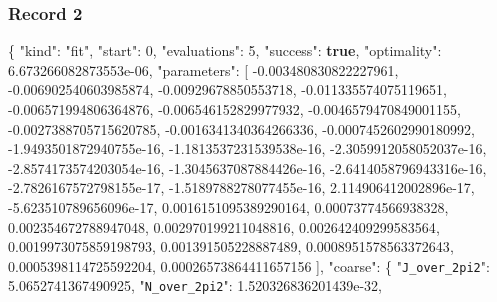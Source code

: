 \documentclass[
  10pt,
]{article}
\newenvironment{Shaded}{}{}
\newcommand{\DataTypeTok}[1]{\textcolor[rgb]{0.56,0.13,0.00}{#1}}
\newcommand{\DecValTok}[1]{\textcolor[rgb]{0.25,0.63,0.44}{#1}}
\newcommand{\FloatTok}[1]{\textcolor[rgb]{0.25,0.63,0.44}{#1}}
\newcommand{\FunctionTok}[1]{\textcolor[rgb]{0.02,0.16,0.49}{#1}}
\newcommand{\KeywordTok}[1]{\textcolor[rgb]{0.00,0.44,0.13}{\textbf{#1}}}
\newcommand{\OtherTok}[1]{\textcolor[rgb]{0.00,0.44,0.13}{#1}}
\newcommand{\StringTok}[1]{\textcolor[rgb]{0.25,0.44,0.63}{#1}}
\begin{document}
\hypertarget{record-2-3}{%
\subsubsection{Record 2}\label{record-2-3}}

\begin{Shaded}
\begin{Highlighting}[]
\FunctionTok{\{}
  \DataTypeTok{"kind"}\FunctionTok{:} \StringTok{"fit"}\FunctionTok{,}
  \DataTypeTok{"start"}\FunctionTok{:} \DecValTok{0}\FunctionTok{,}
  \DataTypeTok{"evaluations"}\FunctionTok{:} \DecValTok{5}\FunctionTok{,}
  \DataTypeTok{"success"}\FunctionTok{:} \KeywordTok{true}\FunctionTok{,}
  \DataTypeTok{"optimality"}\FunctionTok{:} \FloatTok{6.673266082873553e{-}06}\FunctionTok{,}
  \DataTypeTok{"parameters"}\FunctionTok{:} \OtherTok{[}
    \FloatTok{{-}0.003480830822227961}\OtherTok{,}
    \FloatTok{{-}0.006902540603985874}\OtherTok{,}
    \FloatTok{{-}0.00929678850553718}\OtherTok{,}
    \FloatTok{{-}0.011335574075119651}\OtherTok{,}
    \FloatTok{{-}0.006571994806364876}\OtherTok{,}
    \FloatTok{{-}0.006546152829977932}\OtherTok{,}
    \FloatTok{{-}0.0046579470849001155}\OtherTok{,}
    \FloatTok{{-}0.0027388705715620785}\OtherTok{,}
    \FloatTok{{-}0.0016341340364266336}\OtherTok{,}
    \FloatTok{{-}0.0007452602990180992}\OtherTok{,}
    \FloatTok{{-}1.9493501872940755e{-}16}\OtherTok{,}
    \FloatTok{{-}1.1813537231539538e{-}16}\OtherTok{,}
    \FloatTok{{-}2.3059912058052037e{-}16}\OtherTok{,}
    \FloatTok{{-}2.8574173574203054e{-}16}\OtherTok{,}
    \FloatTok{{-}1.3045637087884426e{-}16}\OtherTok{,}
    \FloatTok{{-}2.6414058796943316e{-}16}\OtherTok{,}
    \FloatTok{{-}2.7826167572798155e{-}17}\OtherTok{,}
    \FloatTok{{-}1.5189788278077455e{-}16}\OtherTok{,}
    \FloatTok{2.114906412002896e{-}17}\OtherTok{,}
    \FloatTok{{-}5.623510789656096e{-}17}\OtherTok{,}
    \FloatTok{0.0016151095389290164}\OtherTok{,}
    \FloatTok{0.00073774566938328}\OtherTok{,}
    \FloatTok{0.002354672788947048}\OtherTok{,}
    \FloatTok{0.002970199211048816}\OtherTok{,}
    \FloatTok{0.002642409299583564}\OtherTok{,}
    \FloatTok{0.0019973075859198793}\OtherTok{,}
    \FloatTok{0.001391505228887489}\OtherTok{,}
    \FloatTok{0.0008951578563372643}\OtherTok{,}
    \FloatTok{0.0005398114725592204}\OtherTok{,}
    \FloatTok{0.00026573864411657156}
  \OtherTok{]}\FunctionTok{,}
  \DataTypeTok{"coarse"}\FunctionTok{:} \FunctionTok{\{}
    \DataTypeTok{"\nolinkurl{J_over_2pi2}"}\FunctionTok{:} \FloatTok{5.0652741367490925}\FunctionTok{,}
    \DataTypeTok{"\nolinkurl{N_over_2pi2}"}\FunctionTok{:} \FloatTok{1.520326836201439e{-}32}\FunctionTok{,}

\end{Highlighting}
\end{Shaded}
\end{document}
